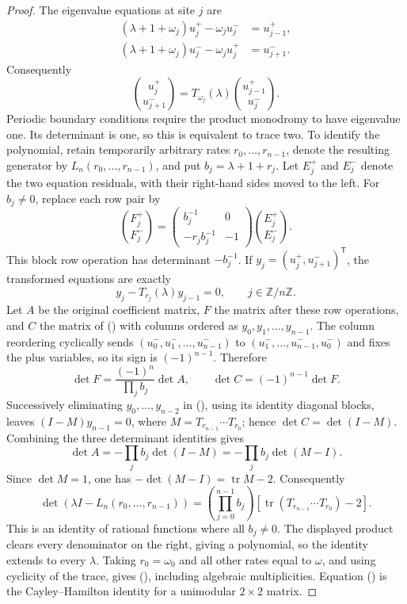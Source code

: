 \documentclass[twoside,10pt]{article}
\numberwithin{equation}{section}
\theoremstyle{slbody}
\theoremstyle{definition}
\theoremstyle{remark}
\renewcommand{\eqref}[1]{%
  \textup{{\normalfont(\oldstylenums{\ref{#1}}}\normalfont)}}
\begin{document}
\begin{proof}
The eigenvalue equations at site $j$ are
\begin{align*}
 (\lambda+1+\omega_j)u_j^+-\omega_j u_j^-&=u_{j-1}^+,\\
 (\lambda+1+\omega_j)u_j^--\omega_j u_j^+&=u_{j+1}^-.
\end{align*}
Consequently
\[
 \binom{u_j^+}{u_{j+1}^-}
 =T_{\omega_j}(\lambda)\binom{u_{j-1}^+}{u_j^-}.
\]
Periodic boundary conditions require the product monodromy to have
eigenvalue one.  Its determinant is one, so this is equivalent to trace
two.  To identify the polynomial, retain temporarily arbitrary rates
$r_0,\ldots,r_{n-1}$, denote the resulting generator by
$L_n(r_0,\ldots,r_{n-1})$, and put $b_j=\lambda+1+r_j$.
Let $E_j^+$ and $E_j^-$ denote the two equation residuals, with their
right-hand sides moved to the left.  For $b_j\ne0$, replace each row pair
by
\[
 \binom{F_j^+}{F_j^-}
 =\begin{pmatrix}b_j^{-1}&0\\-r_jb_j^{-1}&-1\end{pmatrix}
   \binom{E_j^+}{E_j^-}.
\]
This block row operation has determinant $-b_j^{-1}$.  If
$y_j=(u_j^+,u_{j+1}^-)^{\mathsf T}$, the transformed equations are
exactly
\begin{equation}\label{eq:transfer-cyclic-system}
 y_j-T_{r_j}(\lambda)y_{j-1}=0,
 \qquad j\in\mathbb Z/n\mathbb Z.
\end{equation}
Let $A$ be the original coefficient matrix, $F$ the matrix after these
row operations, and $C$ the matrix of
\eqref{eq:transfer-cyclic-system} with columns ordered as
$y_0,y_1,\ldots,y_{n-1}$.  The column reordering cyclically sends
$(u_0^-,u_1^-,\ldots,u_{n-1}^-)$ to
$(u_1^-,\ldots,u_{n-1}^-,u_0^-)$ and fixes the plus variables, so its
sign is $(-1)^{n-1}$.  Therefore
\[
 \det F=\frac{(-1)^n}{\prod_jb_j}\det A,
 \qquad \det C=(-1)^{n-1}\det F.
\]
Successively eliminating $y_0,\ldots,y_{n-2}$ in
\eqref{eq:transfer-cyclic-system}, using its identity diagonal blocks,
leaves
$(I-M)y_{n-1}=0$, where $M=T_{r_{n-1}}\cdots T_{r_0}$; hence
$\det C=\det(I-M)$.  Combining the three determinant identities gives
\[
 \det A=-\prod_jb_j\det(I-M)=-\prod_jb_j\det(M-I).
\]
Since $\det M=1$, one has
$-\det(M-I)=\operatorname{tr}M-2$.  Consequently
\begin{equation}\label{eq:general-transfer-determinant}
 \det(\lambda I-L_n(r_0,\ldots,r_{n-1}))
 =\left(\prod_{j=0}^{n-1}b_j\right)
  \left[\operatorname{tr}(T_{r_{n-1}}\cdots T_{r_0})-2\right].
\end{equation}
This is an identity of rational functions where all $b_j\ne0$.  The
displayed product clears every denominator on the right, giving a
polynomial, so the identity extends to every $\lambda$.  Taking
$r_0=\omega_0$ and all other rates equal to $\omega$, and using cyclicity
of the trace, gives
\eqref{eq:transfer-char}, including algebraic multiplicities.  Equation
\eqref{eq:transfer-cheb} is the Cayley--Hamilton identity for a
unimodular $2\times2$ matrix.
\end{proof}
\end{document}

